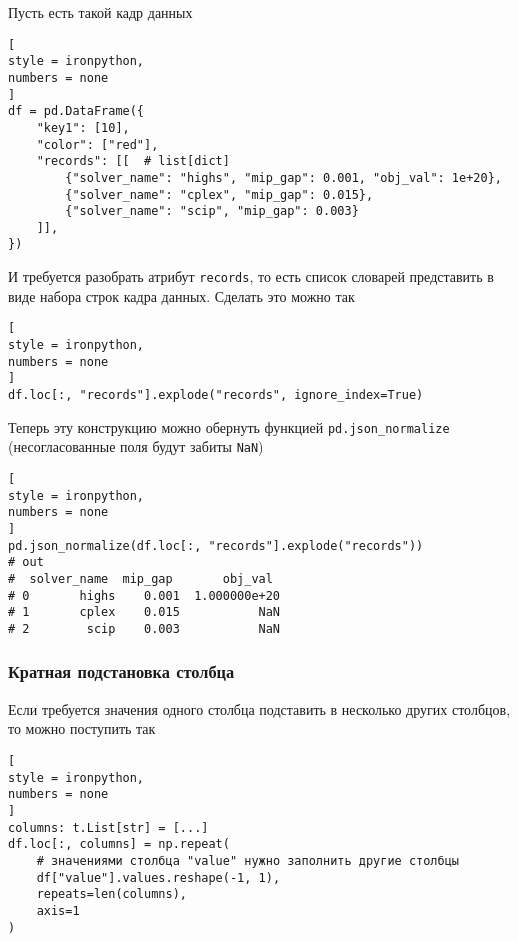 \documentclass[%
	11pt,
	a4paper,
	utf8,
		]{article}
\begin{document}
Пусть есть такой кадр данных
\begin{lstlisting}[
style = ironpython,
numbers = none
]
df = pd.DataFrame({
	"key1": [10],
	"color": ["red"],
	"records": [[  # list[dict]
	    {"solver_name": "highs", "mip_gap": 0.001, "obj_val": 1e+20},
	    {"solver_name": "cplex", "mip_gap": 0.015},
	    {"solver_name": "scip", "mip_gap": 0.003}
	]],
})

\end{lstlisting}

И требуется разобрать атрибут \verb|records|, то есть список словарей представить в виде набора строк кадра данных. Сделать это можно так
\begin{lstlisting}[
style = ironpython,
numbers = none
]
df.loc[:, "records"].explode("records", ignore_index=True)
\end{lstlisting}

Теперь эту конструкцию можно обернуть функцией \verb*|pd.json_normalize| (несогласованные поля будут забиты \verb|NaN|)
\begin{lstlisting}[
style = ironpython,
numbers = none
]
pd.json_normalize(df.loc[:, "records"].explode("records"))
# out
#  solver_name  mip_gap       obj_val
# 0       highs    0.001  1.000000e+20
# 1       cplex    0.015           NaN
# 2        scip    0.003           NaN
\end{lstlisting}

\subsubsection{Кратная подстановка столбца}

Если требуется значения одного столбца подставить в несколько других столбцов, то можно поступить так
\begin{lstlisting}[
style = ironpython,
numbers = none
]
columns: t.List[str] = [...]
df.loc[:, columns] = np.repeat(
    # значениями столбца "value" нужно заполнить другие столбцы
    df["value"].values.reshape(-1, 1),
    repeats=len(columns),
    axis=1
)
\end{lstlisting}
\end{document}

